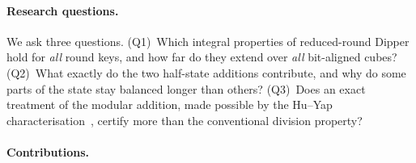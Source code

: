 \documentclass[pdflatex,sn-mathphys-num]{sn-jnl}
\theoremstyle{thmstyleone}
\theoremstyle{thmstylethree}
\theoremstyle{thmstyletwo}
\begin{document}
\paragraph{Research questions.} We ask three questions.
(Q1)~Which integral properties of reduced-round Dipper hold for \emph{all} round keys, and how far do they extend over \emph{all} bit-aligned cubes?
(Q2)~What exactly do the two half-state additions contribute, and why do some parts of the state stay balanced longer than others?
(Q3)~Does an exact treatment of the modular addition, made possible by the Hu--Yap characterisation~\cite{huyap2024}, certify more than the conventional division property?

\paragraph{Contributions.}
\end{document}
